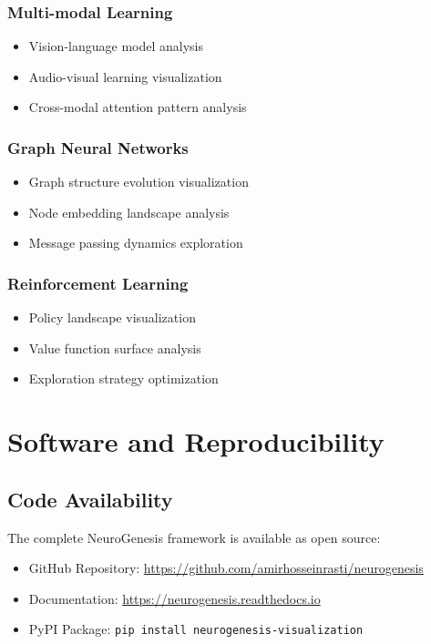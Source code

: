 \documentclass[12pt,a4paper]{article}
\begin{document}
\subsubsection{Multi-modal Learning}

\begin{itemize}
    \item Vision-language model analysis
    \item Audio-visual learning visualization
    \item Cross-modal attention pattern analysis
\end{itemize}

\subsubsection{Graph Neural Networks}

\begin{itemize}
    \item Graph structure evolution visualization
    \item Node embedding landscape analysis
    \item Message passing dynamics exploration
\end{itemize}

\subsubsection{Reinforcement Learning}

\begin{itemize}
    \item Policy landscape visualization
    \item Value function surface analysis
    \item Exploration strategy optimization
\end{itemize}

\section{Software and Reproducibility}
\label{app:software}

\subsection{Code Availability}

The complete NeuroGenesis framework is available as open source:

\begin{itemize}
    \item GitHub Repository: \url{https://github.com/amirhosseinrasti/neurogenesis}
    \item Documentation: \url{https://neurogenesis.readthedocs.io}
    \item PyPI Package: \texttt{pip install neurogenesis-visualization}
\end{itemize}
\end{document}
